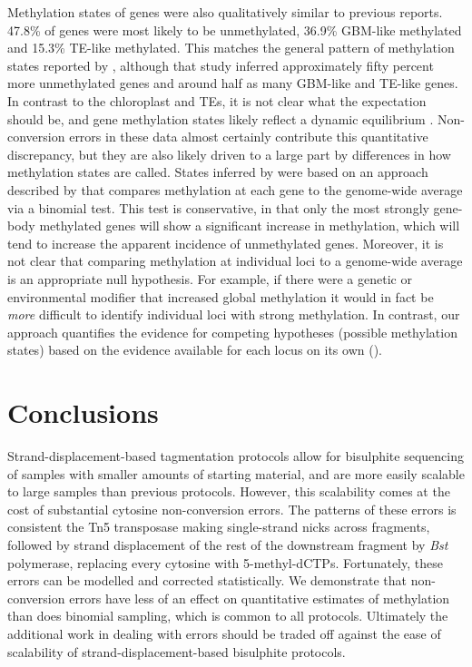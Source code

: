 \documentclass[twocolumn,twoside,lettersize]{article}
\begin{document}
Methylation states of genes were also qualitatively similar to previous reports.
47.8\% of genes were most likely to be unmethylated, 36.9\% GBM-like methylated and 15.3\% TE-like methylated.
This matches the general pattern of methylation states reported by \textcite{zhang2020natural}, although that study inferred approximately fifty percent more unmethylated genes and around half as many GBM-like and TE-like genes.
In contrast to the chloroplast and TEs, it is not clear what the expectation should be, and gene methylation states likely reflect a dynamic equilibrium \parencite{zhang2020natural}.
Non-conversion errors in these data almost certainly contribute this quantitative discrepancy, but they are also likely driven to a large part by differences in how methylation states are called.
States inferred by \textcite{zhang2020natural} were based on an approach described by \textcite{takuno2012body} that compares methylation at each gene to the genome-wide average via a binomial test.
This test is conservative, in that only the most strongly gene-body methylated genes will show a significant increase in methylation, which will tend to increase the apparent incidence of unmethylated genes.
Moreover, it is not clear that comparing methylation at individual loci to a genome-wide average is an appropriate null hypothesis.
For example, if there were a genetic or environmental modifier that increased global methylation it would in fact be \textit{more} difficult to identify individual loci with strong methylation.
In contrast, our approach quantifies the evidence for competing hypotheses (possible methylation states) based on the evidence available for each locus on its own (\cite{chamberlin1890method, burnham2004multimodel}).

\section{Conclusions}

Strand-displacement-based tagmentation protocols allow for bisulphite sequencing of samples with smaller amounts of starting material, and are more easily scalable to large samples than previous protocols.
However, this scalability comes at the cost of substantial cytosine non-conversion errors.
The patterns of these errors is consistent the Tn5 transposase making single-strand nicks across fragments, followed by strand displacement of the rest of the downstream fragment by \textit{Bst} polymerase, replacing every cytosine with 5-methyl-dCTPs.
Fortunately, these errors can be modelled and corrected statistically.
We demonstrate that non-conversion errors have less of an effect on quantitative estimates of methylation than does binomial sampling, which is common to all protocols.
Ultimately the additional work in dealing with errors should be traded off against the ease of scalability of strand-displacement-based bisulphite protocols.
\end{document}
